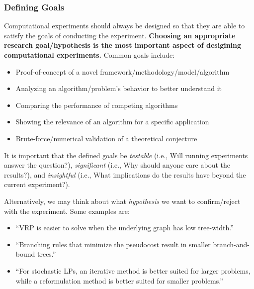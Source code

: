 \documentclass[12pt]{article}
\begin{document}
\subsubsection{Defining Goals}
Computational experiments should always be designed so that they are able to satisfy the goals of conducting the experiment. \textbf{Choosing an appropriate research goal/hypothesis is the most important aspect of desigining computational experiments.} Common goals include:
\begin{itemize}
    \item Proof-of-concept of a novel framework/methodology/model/algorithm
    \item Analyzing an algorithm/problem's behavior to better understand it
    \item Comparing the performance of competing algorithms
    \item Showing the relevance of an algorithm for a specific application
    \item Brute-force/numerical validation of a theoretical conjecture
\end{itemize}
It is important that the defined goals be \emph{testable} (i.e., Will running experiments answer the question?), \emph{significant} (i.e., Why should anyone care about the results?), and \emph{insightful} (i.e., What implications do the results have beyond the current experiment?).

Alternatively, we may think about what \emph{hypothesis} we want to confirm/reject with the experiment. Some examples are:
\begin{itemize}
    \item ``VRP is easier to solve when the underlying graph has low tree-width.''
    \item ``Branching rules that minimize the pseudocost result in smaller branch-and-bound trees.''
    \item ``For stochastic LPs, an iterative method is better suited for larger problems, while a reformulation method is better suited for smaller problems.''
\end{itemize}
\end{document}
